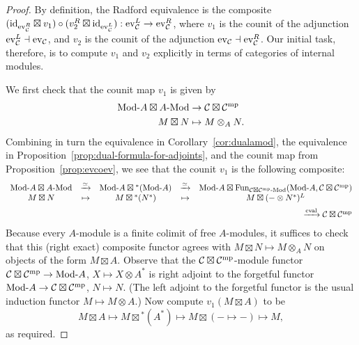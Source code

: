 \documentclass{amsart}
\begin{document}
\begin{proof}
By definition, the Radford equivalence is the composite $(\mathrm{id}_{\mathrm{ev}_\mathcal C^R} \boxtimes v_1) \circ (v_2^R \boxtimes \mathrm{id}_{\mathrm{ev}_\mathcal C^L}) : \mathrm{ev}_\mathcal C^L \rightarrow \mathrm{ev}_\mathcal C^R$, where $v_1$ is the counit of the adjunction $\mathrm{ev}_\mathcal C^L \dashv \mathrm{ev}_\mathcal C$, and $v_2$ is the counit of the adjunction $\mathrm{ev}_\mathcal C \dashv \mathrm{ev}_\mathcal C^R$.  Our initial task, therefore, is to compute $v_1$ and $v_2$ explicitly in terms of categories of internal modules.

We first check that the counit map $v_1$ is given by
\begin{align*}
\Mod{}{A} \boxtimes \Mod{A}{} &\ra \cC \boxtimes \cC^\mp \\
M \boxtimes N &\mapsto M \otimes_A N.
\end{align*}
Combining in turn the equivalence in Corollary~\ref{cor:dualamod}, the equivalence in Proposition~\ref{prop:dual-formula-for-adjoints}, and the counit map from Proposition~\ref{prop:evcoev}, we see that the counit $v_1$ is the following composite:
\[
\begin{array}{ccccc}
\Mod{}{A} \boxtimes \Mod{A}{} 
&\xra{\simeq}& \Mod{}{A} \boxtimes {}^*(\Mod{}{A}) 
&\xra{\simeq}& \Mod{}{A} \boxtimes \Fun_{\Mod{\cC \boxtimes \cC^\mp}{}}(\Mod{}{A},\cC \boxtimes \cC^\mp)  
\\
M \boxtimes N 
&\mapsto& M \boxtimes {}^*(N^*) 
&\mapsto& M \boxtimes (- \otimes N^*)^L
\\[5pt]
&&&&\hfill \xra{\text{eval}} \cC \boxtimes \cC^\mp
\end{array}
\] 
Because every $A$-module is a finite colimit of free $A$-modules, it suffices to check that this (right exact) composite functor agrees with $M \boxtimes N \mapsto M \otimes_A N$ on objects of the form $M \boxtimes A$.  Observe that the $\mathcal C \boxtimes \mathcal C^{\mathrm{mp}}$-module functor $\cC \boxtimes \cC^\mp \ra \Mod{}{A}$, $X \mapsto X \otimes A^*$ is right adjoint to the forgetful functor $\Mod{}{A} \ra \cC \boxtimes \cC^\mp$, $N \mapsto N$.  (The left adjoint to the forgetful functor is the usual induction functor $M \mapsto M \otimes A$.)  Now compute $v_1(M \boxtimes A)$ to be
\[
M \boxtimes A \mapsto M \boxtimes {}^*(A^*) \mapsto M \boxtimes (- \mapsto -) \mapsto M,
\]
as required.


\end{proof}
\end{document}
